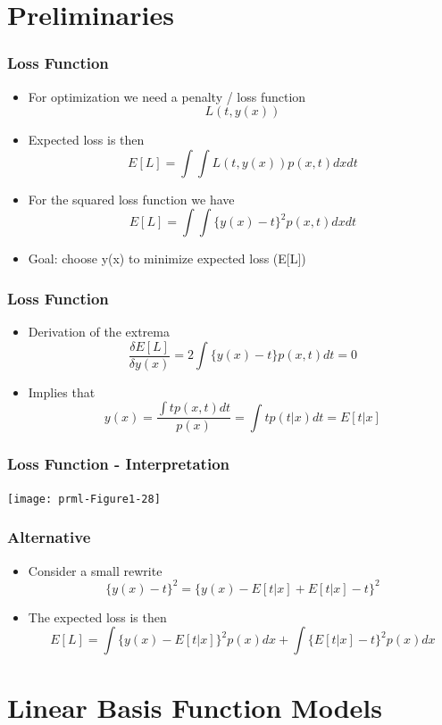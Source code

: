 \documentclass[10pt]{beamer}
\begin{document}
\section{Preliminaries}

\begin{frame}
  \frametitle{Loss Function}
  \begin{itemize}
  \item For optimization we need a penalty / loss function
    \[
    L(t, y(x))
    \]
  \item Expected loss is then
    \[
    E[L] = \int \int L(t,y(x)) p(x,t) dx dt
    \]
  \item For the squared loss function we have
    \[
    E[L] = \int \int \{ y(x) - t \}^2 p(x,t) dx dt
    \]
  \item Goal: choose y(x) to minimize expected loss (E[L])
  \end{itemize}
\end{frame}

\begin{frame}
  \frametitle{Loss Function}
  \begin{itemize}
  \item Derivation of the extrema
    \[ \frac{\delta E[L]}{\delta y(x)} = 2 \int \{ y(x) - t \} p(x,t) dt = 0
    \]
  \item Implies that
    \[
    y(x) = \frac{\int t p(x,t) dt}{p(x)} = \int t p(t|x) dt = E[t|x]
    \]
  \end{itemize}
\end{frame}

\begin{frame}
  \frametitle{Loss Function - Interpretation}
  \begin{center}
    \texttt{[image: prml-Figure1-28]}
  \end{center}
\end{frame}

\begin{frame}
  \frametitle{Alternative}
  \begin{itemize}
  \item Consider a small rewrite
    \[
    \{y(x) - t\}^2 = \{ y(x) - E[t|x] + E[t|x] - t \}^2
    \]
  \item The expected loss is then
    \[
    E[L] = \int \{ y(x) - E[t|x]\}^2 p(x) dx +
           \int \{ E[t|x] - t\}^2 p(x) dx
    \]
  \end{itemize}
\end{frame}

\section[Linear Models]{Linear Basis Function Models}
\end{document}
